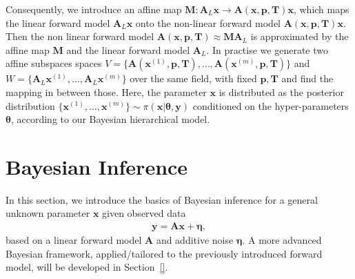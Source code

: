 Consequently, we introduce an affine map $ \bm{M}:\bm{A}_L \bm{x} \rightarrow \bm{A}(\bm{x},  \bm{p},\bm{T}) \bm{x}$, which maps the linear forward model $\bm{A}_L \bm{x}$ onto the non-linear forward model $\bm{A}(\bm{x},  \bm{p},\bm{T}) \bm{x}$.
Then the non linear forward model $\bm{A}(\bm{x},  \bm{p},\bm{T}) \approx \bm{M} \bm{A}_L$ is approximated by the affine map $\bm{M}$ and the linear forward model $\bm{A}_L$.
In practise we generate two affine subspaces spaces $V = \big\{ \bm{A}(\bm{x}^{(1)}, \bm{p,T}), \dots ,\bm{A}(\bm{x}^{(m)}, \bm{p,T})\big\} $ and $W = \big\{ \bm{A}_L\bm{x}^{(1)}, \dots ,\bm{A}_L\bm{x}^{(m)}\big\}$ over the same field, with fixed $\bm{p,T}$ and find the mapping in between those.
Here, the parameter $\bm{x}$ is distributed as the posterior distribution $\big\{  \bm{x}^{(1)} , \dots, \bm{x}^{(m)} \big\} \sim \pi(\bm{x}|\bm{\theta},\bm{y})$ conditioned on the hyper-parameters $\bm{\theta}$, according to our Bayesian hierarchical model.


\section{Bayesian Inference}
\label{sec:bayes}
In this section, we introduce the basics of Bayesian inference for a general unknown parameter $\bm{x}$ given observed data
\begin{align}
	\bm{y} = \bm{A} \bm{x} + \bm{\eta},
	\label{eq:LinDat}
\end{align}
based on a linear forward model $\bm{A}$ and additive noise $\bm{\eta}$.
A more advanced Bayesian framework, applied/tailored to the previously introduced forward model, will be developed in Section~\ref{}.





